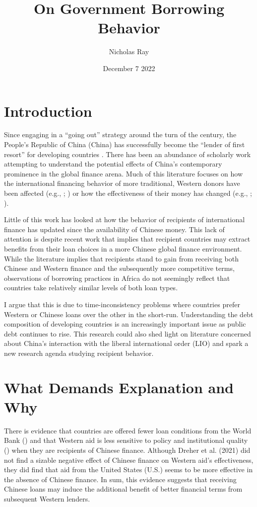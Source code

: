 \documentclass{article}
\title{\vspace{-2.75cm}On Government Borrowing Behavior\vspace{-0.5cm}}
\author{Nicholas Ray}
\date{\vspace{-0.30cm}December 7 2022\vspace{-1cm}}
\begin{document}
\maketitle
\section*{Introduction}
Since engaging in a ``going out'' strategy around the turn of the century, the People's Republic of China (China) has successfully become the ``lender of first resort'' for developing countries \parencite[1]{dreher2022}. There has been an abundance of scholarly work attempting to understand the potential effects of China's contemporary prominence in the global finance arena. Much of this literature focuses on how the international financing behavior of more traditional, Western donors have been affected (e.g., \cite{humphrey2019}; \cite{kilama2016a}) or how the effectiveness of their money has changed (e.g., \cite{blair2022}; \cite{gehring2022}).

Little of this work has looked at how the behavior of recipients of international finance has updated since the availability of Chinese money. This lack of attention is despite recent work that implies that recipient countries may extract benefits from their loan choices in a more Chinese global finance environment. While the literature implies that recipients stand to gain from receiving both Chinese and Western finance and the subsequently more competitive terms, observations of borrowing practices in Africa do not seemingly reflect that countries take relatively similar levels of both loan types. 

I argue that this is due to time-inconsistency problems where countries prefer Western or Chinese loans over the other in the short-run. Understanding the debt composition of developing countries is an increasingly important issue as public debt continues to rise. This research could also shed light on literature concerned about China's interaction with the liberal international order (LIO) and spark a new research agenda studying recipient behavior.

\section*{What Demands Explanation and Why}
There is evidence that countries are offered fewer loan conditions from the World Bank (\cite{hernandez2017}) and that Western aid is less sensitive to policy and institutional quality (\cite{annen2021}) when they are recipients of Chinese finance. Although Dreher et al. (2021)\nocite{dreher2021} did not find a sizable negative effect of Chinese finance on Western aid's effectiveness, they did find that aid from the United States (U.S.) seems to be more effective in the absence of Chinese finance. In sum, this evidence suggests that receiving Chinese loans may induce the additional benefit of better financial terms from subsequent Western lenders.
\end{document}
